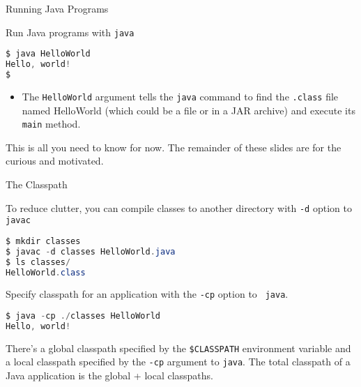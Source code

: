 \documentclass{beamer}
\begin{document}
\begin{frame}[fragile]{Running Java Programs}


Run Java programs with {\tt java}
\begin{lstlisting}[language=Scala]
$ java HelloWorld
Hello, world!
$
\end{lstlisting}
\begin{itemize}
\item The {\tt HelloWorld} argument tells the {\tt java} command to find the {\tt .class} file named HelloWorld (which could be a file or in a JAR archive) and execute its {\tt main} method.
\end{itemize}
This is all you need to know for now.  The remainder of these slides are for the curious and motivated.
\end{frame}

\begin{frame}[fragile]{The Classpath}


To reduce clutter, you can compile classes to another directory with {\tt -d} option to
{\tt javac} 
\begin{lstlisting}[language=Java]
$ mkdir classes
$ javac -d classes HelloWorld.java
$ ls classes/
HelloWorld.class
\end{lstlisting}
Specify classpath for an application with the {\tt -cp} option to {\tt
  java}.
\begin{lstlisting}[language=Java]
$ java -cp ./classes HelloWorld
Hello, world!
\end{lstlisting}

There's a global classpath specified by the {\tt \$CLASSPATH} environment variable and a local
classpath specified by the {\tt -cp} argument to {\tt java}.  The total classpath of a Java application is the global + local classpaths.

\end{frame}
\end{document}
